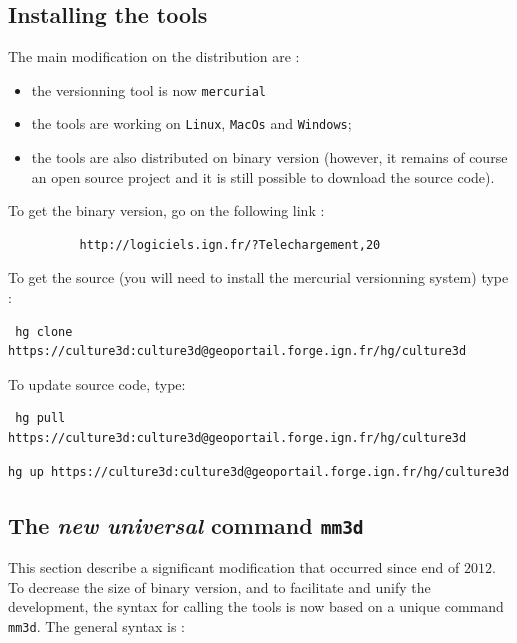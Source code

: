 \subsection{Installing the tools}
\label{Install}

The main modification on the distribution are :

\begin{itemize}
   \item  the versionning tool is now {\tt mercurial}
   \item  the tools are working on {\tt Linux}, {\tt MacOs} and  {\tt Windows};
   \item  the tools are also distributed on binary  version (however, it  remains of course
          an open source project and it is still possible to download the source code).
\end{itemize}

To get the binary version, go on the following link :

\begin{verbatim}
          http://logiciels.ign.fr/?Telechargement,20
\end{verbatim}

To get the source (you will need to install the mercurial versionning system) type :

\begin{verbatim}
 hg clone https://culture3d:culture3d@geoportail.forge.ign.fr/hg/culture3d
\end{verbatim}

To update source code, type:
 
\begin{verbatim}
 hg pull https://culture3d:culture3d@geoportail.forge.ign.fr/hg/culture3d 
\end{verbatim}

\begin{verbatim}
hg up https://culture3d:culture3d@geoportail.forge.ign.fr/hg/culture3d 
\end{verbatim}

\subsection{The \emph{new universal} command {\tt mm3d}}

This section describe a significant modification that occurred since end of $2012$. To decrease the
size of binary version, and to facilitate and unify the development, the syntax for calling the tools is now
based on a unique command {\tt mm3d}. The general syntax is :

